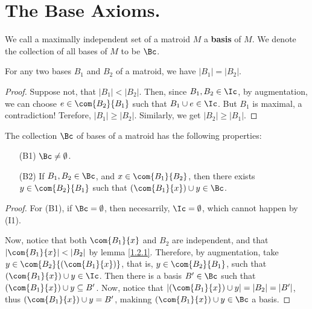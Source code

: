 
\section{The Base Axioms.}

\begin{definition}
    We call a maximally independent set of a matroid $M$ a \textbf{basis} of
    $M$.  We denote the collection of all bases of  $M$ to be  $\Bc$.
\end{definition}

\begin{lemma}\label{1.2.1}
    For any two bases $B_1$ and $B_2$ of a matroid, we have $|B_1|=|B_2|$.
\end{lemma}
\begin{proof}
    Suppose not, that $|B_1|<|B_2|$. Then, since $B_1,B_2 \in \Ic$, by
    augmentation, we can choose  $e \in \com{B_2}{B_1}$ such that $B_1 \cup e
    \in \Ic$. But $B_1$ is maximal, a contradiction! Terefore, $|B_1| \geq
    |B_2|$. Similarly, we get $|B_2| \geq |B_1|$.
\end{proof}

\begin{lemma}\label{1.2.2}
    The collection $\Bc$ of bases of a matroid has the following properties:
    \begin{enumerate}
        \item[(B1)] $\Bc \neq \emptyset$.

        \item [(B2)] If $B_1,B_2 \in \Bc$, and $x \in \com{B_1}{B_2}$, then
            there exists $y \in \com{B_2}{B_1}$ such that $(\com{B_1}{x}) \cup y
            \in \Bc$.
    \end{enumerate}
\end{lemma}
\begin{proof}
    For (B1), if $\Bc=\emptyset$, then necesarrily,  $\Ic=\emptyset$, which
    cannot happen by (I1).

    Now, notice that both $\com{{B_1}}{x}$ and $B_2$ are independent, and that
    $|\com{B_1}{x}|<|B_2|$ by lemma \ref{1.2.1}. Therefore, by augmentation,
    take $y \in \com{B_2}{(\com{B_1}{x})}$, that is, $y \in \com{B_2}{B_1}$,
    such that $(\com{B_1}{x}) \cup y \in \Ic$. Then there is a basis $B' \in
    \Bc$ such that  $(\com{B_1}{x}) \cup y \subseteq B'$. Now, notice that
    $|(\com{B_1}{x}) \cup y|=|B_2|=|B'|$, thus $(\com{B_1}{x}) \cup y=B'$,
    makinng $(\com{B_1}{x}) \cup y \in \Bc$ a basis.
\end{proof}

